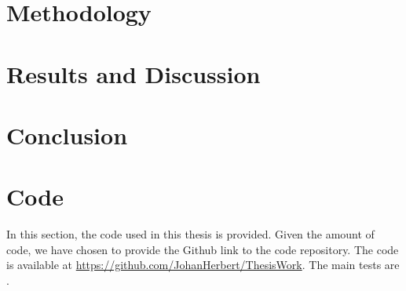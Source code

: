 \documentclass[%
a4paper,							
11pt,								
bibliography=totoc,						
abstracton=true					
]
{scrartcl}
\theoremstyle{plain}
\theoremstyle{definition}
\theoremstyle{remark}
\newcommand{\1}{\mathbbm{1}}
\begin{document}
\section{Methodology}\label{sec:Method}



\section{Results and Discussion}\label{sec:Results}



\section{Conclusion}\label{sec:Conclusion}


\newpage
\appendix

\printbibliography
\section{Code}\label{sec:Code}
In this section, the code used in this thesis is provided. Given the amount of code, we have chosen to provide the Github link to the code repository. The code is available at \url{https://github.com/JohanHerbert/ThesisWork}. The main tests are . 
\end{document}
